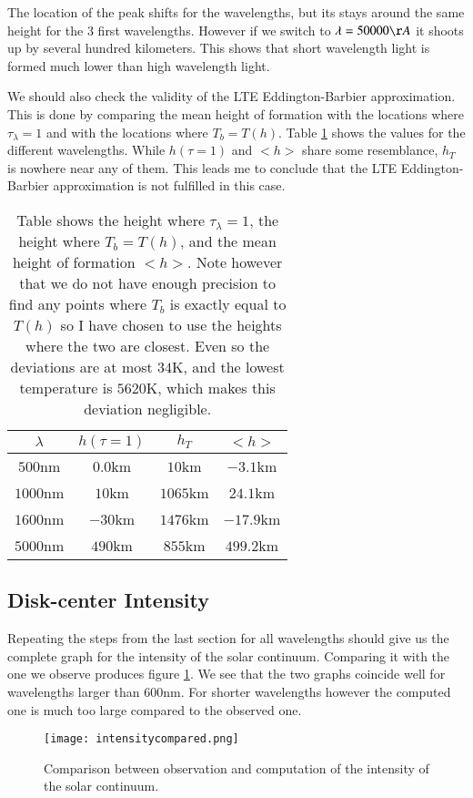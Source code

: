 \documentclass{aa}   %
\begin{document}
The location of the peak shifts for the wavelengths, but its stays around the same height for the 3 first wavelengths. However if we switch to $\lambda = 50000 \AA$ it shoots up by several hundred kilometers. This shows that short wavelength light is formed much lower than high wavelength light.

We should also check the validity of the LTE Eddington-Barbier approximation. This is done by comparing the mean height of formation with the locations where $\tau_\lambda = 1$ and with the locations where $T_b = T(h)$.
Table \ref{ebtable} shows the values for the different wavelengths. While $h(\tau=1)$ and $<h>$ share some resemblance, $h_T$ is nowhere near any of them. This leads me to conclude that the LTE Eddington-Barbier approximation is not fulfilled in this case.
\begin{table}
\begin{tabular}{|c|c|c|c|}
\hline
$\lambda$&$h(\tau = 1)$ & $h_T$ &$<h>$ \\
\hline
$500$nm& $0.0$km &$10$km & $-3.1$km\\
\hline
$1000$nm&$10$km& $1065$km & $24.1$km\\
\hline
$1600$nm&$-30$km & $1476$km &$-17.9$km\\
\hline
$5000$nm&$490$km & $855$km & $499.2$km\\
\hline
\end{tabular}
\caption{Table shows the height where $\tau_\lambda = 1$, the height where $T_b = T(h)$, and the mean height of formation $<h>$. Note however that we do not have enough precision to find any points where $T_b$ is exactly equal to $T(h)$ so I have chosen to use the heights where the two are closest. Even so the deviations are at most $34$K, and the lowest temperature is $5620$K, which makes this deviation negligible.}
\label{ebtable}
\end{table}

\subsection{Disk-center Intensity}
Repeating the steps from the last section for all wavelengths should give us the complete graph for the intensity of the solar continuum.
Comparing it with the one we observe produces figure \ref{intensitycompared}. We see that the two graphs coincide well for wavelengths larger than $600$nm. For shorter wavelengths however the computed one is much too large compared to the observed one.

\begin{figure}
 \texttt{[image: intensitycompared.png]}
 \caption{Comparison between observation and computation of the intensity of the solar continuum.}
 \label{intensitycompared}
\end{figure}
\end{document}
